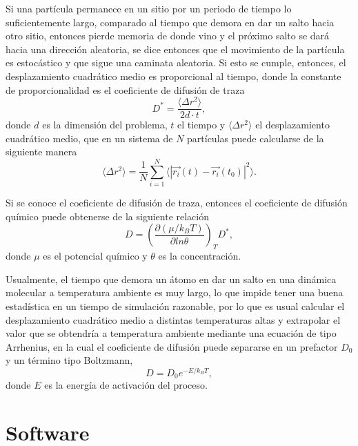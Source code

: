 Si una partícula permanece en un sitio por un periodo de tiempo lo suficientemente 
largo, comparado al tiempo que demora en dar un salto hacia otro sitio, entonces 
pierde memoria de donde vino y el próximo salto se dará hacia una dirección 
aleatoria, se dice entonces que el movimiento de la partícula es estocástico y 
que sigue una caminata aleatoria. Si esto se cumple, entonces, el desplazamiento 
cuadrático medio es proporcional al tiempo, donde la constante de proporcionalidad 
es el coeficiente de difusión de traza
\begin{equation}
    D^{*} = \frac{\langle \Delta r^2 \rangle}{2d\cdot t},
\end{equation}
donde $d$ es la dimensión del problema, $t$ el tiempo y 
$\langle \Delta r^2 \rangle$ el desplazamiento cuadrático medio, que en un sistema 
de $N$ partículas puede calcularse de la siguiente manera
\begin{equation*}
\langle \Delta r^2 \rangle = \frac{1}{N} \sum_{i=1}^{N} \langle |\vec{r_i}(t) - \vec{r_i}(t_0)|^2 \rangle.
\end{equation*}

Si se conoce el coeficiente de difusión de traza, entonces el coeficiente de 
difusión químico puede obtenerse de la siguiente relación ~\cite{gomer1990}
\begin{equation}
    D = \left( \frac{\partial (\mu / k_BT)}{\partial ln \theta} \right)_T D^{*},
\end{equation}
donde $\mu$ es el potencial químico y $\theta$ es la concentración.

Usualmente, el tiempo que demora un átomo en dar un salto en una dinámica 
molecular a temperatura ambiente es muy largo, lo que impide tener una buena 
estadística en un tiempo de simulación razonable, por lo que es usual calcular 
el desplazamiento cuadrático medio a distintas temperaturas altas y extrapolar
el valor que se obtendría a temperatura ambiente mediante una ecuación de tipo 
Arrhenius, en la cual el coeficiente de difusión puede separarse en un 
prefactor $D_0$ y un término tipo Boltzmann,
\begin{equation*}
D = D_0 e^{-E / k_BT},
\end{equation*}
donde $E$ es la energía de activación del proceso. 


\section{Software}


